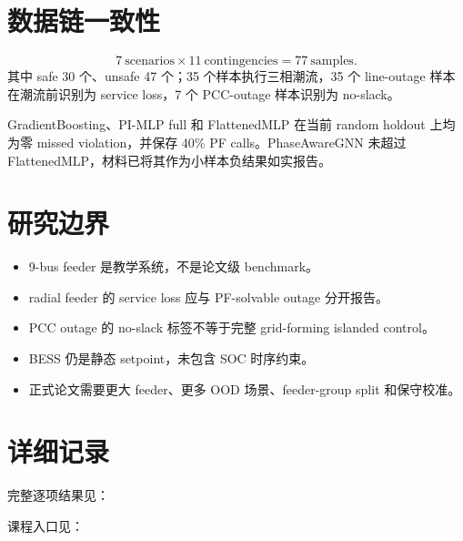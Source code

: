 \documentclass[UTF8,11pt]{ctexart}
\begin{document}
\section{数据链一致性}
\[
7\ \text{scenarios}\times 11\ \text{contingencies}=77\ \text{samples}.
\]
其中 safe 30 个、unsafe 47 个；35 个样本执行三相潮流，35 个 line-outage 样本在潮流前识别为 service loss，7 个 PCC-outage 样本识别为 no-slack。

GradientBoosting、PI-MLP full 和 FlattenedMLP 在当前 random holdout 上均为零 missed violation，并保存 40\% PF calls。PhaseAwareGNN 未超过 FlattenedMLP，材料已将其作为小样本负结果如实报告。

\section{研究边界}
\begin{itemize}
  \item 9-bus feeder 是教学系统，不是论文级 benchmark。
  \item radial feeder 的 service loss 应与 PF-solvable outage 分开报告。
  \item PCC outage 的 no-slack 标签不等于完整 grid-forming islanded control。
  \item BESS 仍是静态 setpoint，未包含 SOC 时序约束。
  \item 正式论文需要更大 feeder、更多 OOD 场景、feeder-group split 和保守校准。
\end{itemize}

\section{详细记录}
完整逐项结果见：

课程入口见：
\end{document}
